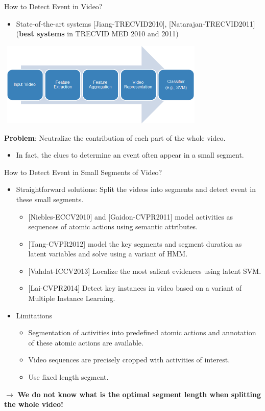 \documentclass{beamer}
\begin{document}
\begin{frame}[t]{How to Detect Event in Video?}
	\begin{itemize}
		\item State-of-the-art systems [Jiang-TRECVID2010], [Natarajan-TRECVID2011] (\textbf{best systems} in TRECVID MED 2010 and 2011)
	\end{itemize}
	
	\begin{center}
		\includegraphics[width=10cm,height=4cm]{images/part2/standardapproach.png}
	\end{center}
	
	\textbf{Problem}: Neutralize the contribution of each part of the whole video. 
	\begin{itemize}
		\item In fact, the clues to determine an event often appear in a small segment.
	\end{itemize}
	
\end{frame}

\begin{frame}[t]{How to Detect Event in Small Segments of Video?}
		\begin{itemize}
\item Straightforward solutions: Split the videos into segments and detect event in these small segments. 
	\begin{itemize}
		\item $[$Niebles-ECCV2010] and [Gaidon-CVPR2011] model activities as sequences of atomic actions using semantic attributes.
		\item $[$Tang-CVPR2012] model the key segments and segment duration as latent variables and solve using a variant of HMM.
		\item $[$Vahdat-ICCV2013] Localize the most salient evidences using latent SVM. 
		\item $[$Lai-CVPR2014] Detect key instances in video based on a variant of Multiple Instance Learning. 
	\end{itemize}

\item Limitations
	\begin{itemize}
		\item Segmentation of activities into predefined atomic
		actions and annotation of these atomic actions are available.
		\item Video sequences are precisely cropped with activities of interest.
		\item Use fixed length segment. 
	\end{itemize}
			\end{itemize}
	$\rightarrow$ \textbf{We do not know what is the optimal segment length when splitting the whole video!}
	
\end{frame}
\end{document}
